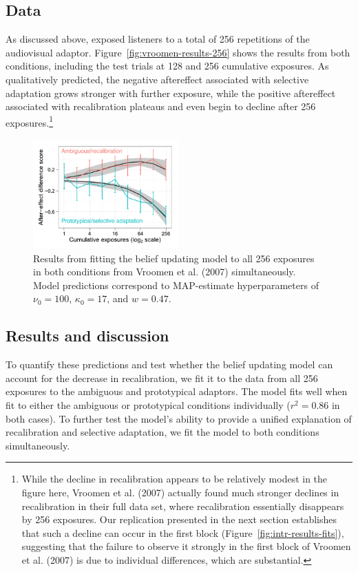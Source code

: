 \subsection{Data}
As discussed above,  exposed listeners to a total of 256 repetitions of the audiovisual adaptor.  Figure~\ref{fig:vroomen-results-256} shows the results from both conditions, including the test trials at 128 and 256 cumulative exposures.  As qualitatively predicted, the negative aftereffect associated with selective adaptation grows stronger with further exposure, while the positive aftereffect associated with recalibration plateaus and even begin to decline after 256 exposures.\footnote{While the decline in recalibration appears to be relatively modest in the figure here, Vroomen et al. (2007) actually found much stronger declines in recalibration in their full data set, where recalibration essentially disappears by 256 exposures.  Our replication presented in the next section establishes that such a decline can occur in the first block (Figure~\ref{fig:intr-results-fits}), suggesting that the failure to observe it strongly in the first block of Vroomen et al. (2007) is due to individual differences, which are substantial.}

\begin{figure}[htb]
  \centering
  \includegraphics[width=0.5\textwidth]{vroomen-preds-firstblock.pdf}
  \caption{Results from fitting the belief updating model to all 256 exposures in both conditions from Vroomen et al. (2007) simultaneously.  Model predictions correspond to MAP-estimate hyperparameters of $\nu_0 = 100$, $\kappa_0=17$, and $w=0.47$.}
  \label{fig:model-fits-vroomen-256-simult}
\end{figure}

\subsection{Results and discussion}
To quantify these predictions and test whether the belief updating model can account for the decrease in recalibration, we fit it to the data from all 256 exposures to the ambiguous and prototypical adaptors.
The model fits well when fit to either the ambiguous or prototypical conditions individually ($r^2=0.86$ in both cases). To further test the model's ability to provide a unified explanation of recalibration and selective adaptation, we fit the model to both conditions simultaneously.

